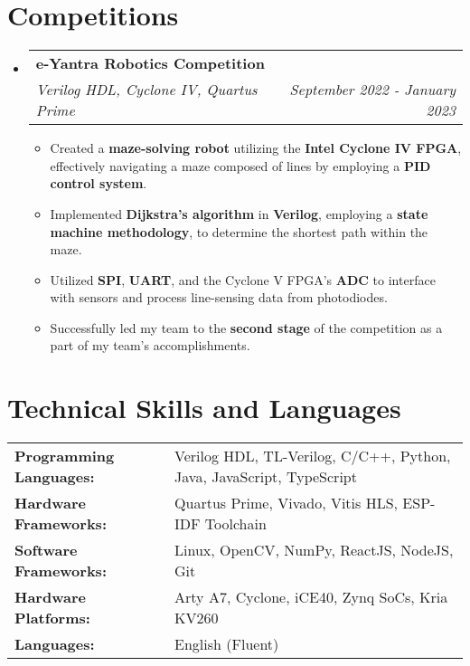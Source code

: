 \documentclass[letterpaper,11pt]{article}
\makeatletter
\newcommand{\resumeItem}[1]{
  \item\small{
    {#1 \vspace{-2pt}}
  }
}
\newcommand{\resumeSubheading}[4]{
  \vspace{-2pt}\item
    \begin{tabular*}{1.0\textwidth}[t]{l@{\extracolsep{\fill}}r}
      \textbf{#1} & \textbf{\small #2} \\
      \textit{\small#3} & \textit{\small #4} \\
    \end{tabular*}\vspace{-7pt}
}
\newcommand{\resumeSubHeadingListStart}{\begin{itemize}[leftmargin=0.0in, label={}]}
\newcommand{\resumeSubHeadingListEnd}{\end{itemize}}
\newcommand{\resumeItemListStart}{\begin{itemize}}
\newcommand{\resumeItemListEnd}{\end{itemize}\vspace{-5pt}}
\makeatother
\begin{document}
\section{Competitions}
\resumeSubHeadingListStart
\resumeSubheading
{e-Yantra Robotics Competition \href{{https://portal.e-yantra.org/}}{\faExternalLink}}{}
{Verilog HDL, Cyclone IV, Quartus Prime}{September 2022 - January 2023}
\resumeItemListStart
\resumeItem{Created a \textbf{maze-solving robot} utilizing the \textbf{Intel Cyclone IV FPGA}, effectively navigating a maze composed of lines by employing a \textbf{PID control system}.}
\resumeItem{Implemented \textbf{Dijkstra's algorithm} in \textbf{Verilog}, employing a \textbf{state machine methodology}, to determine the shortest path within the maze.}
\resumeItem{Utilized \textbf{SPI}, \textbf{UART}, and the Cyclone V FPGA's \textbf{ADC} to interface with sensors and process line-sensing data from photodiodes.}
\resumeItem{Successfully led my team to the \textbf{second stage} of the competition as a part of my team's accomplishments.}
\resumeItemListEnd
\resumeSubHeadingListEnd

\section{Technical Skills and Languages}
\begin{tabular}{ll}
  \textbf{Programming Languages:} & Verilog HDL, TL-Verilog, C/C++, Python, Java, JavaScript, TypeScript \\
  \textbf{Hardware Frameworks:}   & Quartus Prime, Vivado, Vitis HLS, ESP-IDF Toolchain                  \\
  \textbf{Software Frameworks:}   & Linux, OpenCV, NumPy, ReactJS, NodeJS, Git                           \\
  \textbf{Hardware Platforms:}    & Arty A7, Cyclone, iCE40, Zynq SoCs, Kria KV260                       \\
  \textbf{Languages:}             & English (Fluent)                                                   
\end{tabular}

\end{document}
